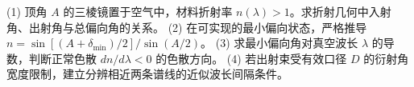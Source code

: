 (1) 顶角 \(A\) 的三棱镜置于空气中，材料折射率 \(n(\lambda)>1\)。求折射几何中入射角、出射角与总偏向角的关系。
(2) 在可实现的最小偏向状态，严格推导 \(n=\sin[(A+\delta_{\min})/2]/\sin(A/2)\)。
(3) 求最小偏向角对真空波长 \(\lambda\) 的导数，判断正常色散 \(dn/d\lambda<0\) 的色散方向。
(4) 若出射束受有效口径 \(D\) 的衍射角宽度限制，建立分辨相近两条谱线的近似波长间隔条件。
